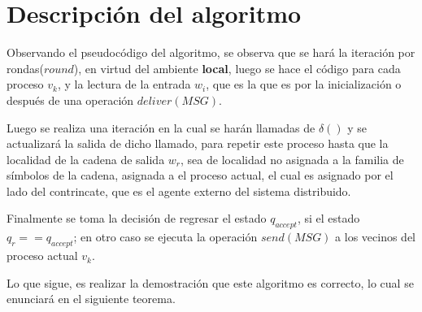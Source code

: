 \documentclass[10pt]{report}
\begin{document}
    \section{Descripción del algoritmo}\label{sec:descripción-del-algoritmo}
    Observando el pseudocódigo del algoritmo, se observa que se hará la iteración por rondas($round$), en
    virtud del ambiente \textbf{local}, luego se hace el código para cada proceso $v_{k}$, y la lectura de
    la entrada $w_{i}$, que es la que es por la inicialización o después de una operación $deliver(MSG)$.
    \newline

    Luego se realiza una iteración en la cual se harán llamadas de $\delta()$ y se actualizará la salida de dicho llamado, para repetir este
    proceso hasta que la localidad de la cadena de salida $w_{r}$, sea de localidad no asignada a la familia de símbolos
    de la cadena, asignada a el proceso actual, el cual es asignado por el lado del contrincate, que es el agente externo del sistema distribuido.
    \newline

    Finalmente se toma la decisión de regresar el estado $q_{accept}$, si el estado $q_{r}==q_{accept}$;
    en otro caso se ejecuta la operación $send(MSG)$ a los vecinos del proceso actual $v_{k}$.
    \newline

    Lo que sigue, es realizar la demostración que este algoritmo es correcto, lo cual se enunciará en el siguiente teorema.
    \newline
\end{document}
